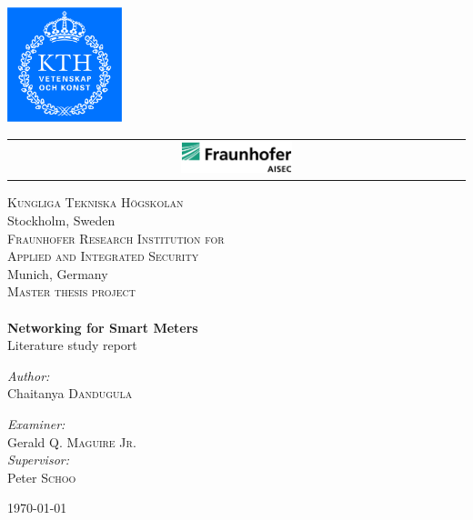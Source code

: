 \begin{titlepage}

\begin{center}


\includegraphics[width=0.25\textwidth]{logo/kth_cmyk.pdf}
\begin{tabular}{ c }
\includegraphics[width=0.25\textwidth]{logo/aisec.pdf} \\[2.3cm]  
\end{tabular}

\textsc{\LARGE Kungliga Tekniska H\"ogskolan}\\
{\large Stockholm, Sweden}\\[1.5cm]
\textsc{\LARGE Fraunhofer Research Institution for}\\ [0.25cm]
\textsc{\LARGE Applied and Integrated Security}\\
{\large Munich, Germany}\\[1.5cm]
\textsc{\Large Master thesis project}\\[0.5cm]


\HRule \\[0.4cm]
{ \huge \bfseries Networking for Smart Meters}\\[0.4cm]
{\large Literature study report}
\HRule \\[1.5cm]

\begin{minipage}{0.4\textwidth}
\begin{flushleft} \large
\emph{Author:}\\
Chaitanya \textsc{Dandugula}
\end{flushleft}
\end{minipage}
\begin{minipage}{0.4\textwidth}
\begin{flushright} \large
\emph{Examiner:} \\
Gerald \textsc{Q. Maguire Jr.}\\
\emph{Supervisor:} \\
Peter \textsc{Schoo}
\end{flushright}
\end{minipage}

\vfill

{\large \today}

\end{center}

\end{titlepage}